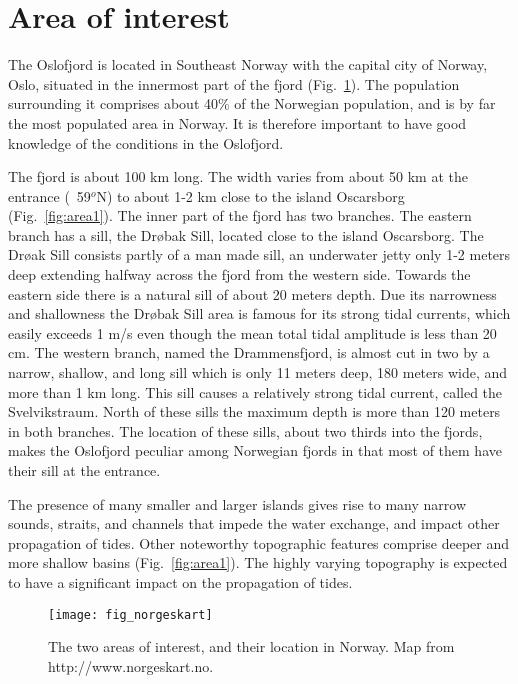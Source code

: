\section{Area of interest}

The Oslofjord is located in Southeast Norway with the capital city of Norway, Oslo, situated in the innermost part of the fjord (Fig.~\ref{fig:area0}). The population surrounding it comprises about 40\% of the Norwegian population, and is by far the most populated area in Norway. It is therefore important to have good knowledge of the conditions in the Oslofjord. 

The fjord is about 100 km long. The width varies from about 50 km at the entrance (~59$^o$N) to about 1-2 km close to the island Oscarsborg (Fig.~\ref{fig:area1}). 
The inner part of the fjord has two branches. 
The eastern branch has a sill, the Dr{\o}bak Sill, located close to the island Oscarsborg. The Dr{\o}ak Sill consists partly of a man made sill, an underwater jetty only 1-2 meters deep extending halfway across the fjord from the western side. Towards the eastern side there is a natural sill of about 20 meters depth. Due its narrowness and shallowness the Dr{\o}bak Sill area is famous for its strong tidal currents, which easily exceeds 1 m/s even though the mean total tidal amplitude is less than 20 cm. 
The western branch, named the Drammensfjord, is almost cut in two by a narrow, shallow, and long sill which is only 11 meters deep, 180 meters wide, and more than 1 km long. This sill causes a relatively strong tidal current, called the Svelvikstraum.
North of these sills the maximum depth is more than 120 meters in both branches. 
The location of these sills, about two thirds into the fjords, makes the Oslofjord peculiar among Norwegian fjords in that most of them have their sill at the entrance.

The presence of many smaller and larger islands gives rise to many narrow sounds, straits, and channels that impede the water exchange, and impact other propagation of tides. Other noteworthy topographic features comprise deeper and more shallow basins (Fig.~\ref{fig:area1}). The highly varying topography is expected to have a significant impact on the propagation of tides.


\begin{figure}[htb]
\centering
\texttt{[image: fig\_norgeskart]}
\caption{The two areas of interest, and their location in Norway. Map from http://www.norgeskart.no.}
\label{fig:area0}
\end{figure}



